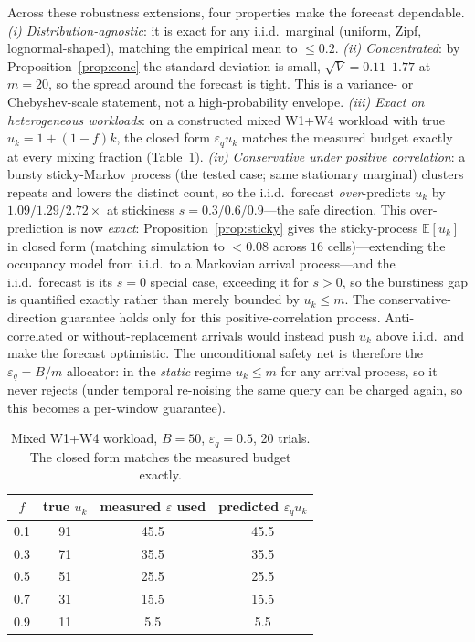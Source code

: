 \documentclass[sigconf,nonacm]{acmart}
\newcommand{\eps}{\varepsilon}
\newcommand{\E}{\mathbb{E}}
\begin{document}
\noindent Across these robustness extensions, four properties make the forecast dependable. \emph{(i) Distribution-agnostic}: it is exact for any i.i.d.\ marginal (uniform, Zipf, lognormal-shaped), matching the empirical mean to $\le0.2$. \emph{(ii) Concentrated}: by Proposition~\ref{prop:conc} the standard deviation is small, $\sqrt V{=}0.11$--$1.77$ at $m{=}20$, so the spread around the forecast is tight. This is a variance- or Chebyshev-scale statement, not a high-probability envelope. \emph{(iii) Exact on heterogeneous workloads}: on a constructed mixed W1+W4 workload with true $u_k=1+(1-f)k$, the closed form $\eps_q u_k$ matches the measured budget exactly at every mixing fraction (Table~\ref{tab:mixed}). \emph{(iv) Conservative under \emph{positive} correlation}: a bursty sticky-Markov process (the tested case; same stationary marginal) clusters repeats and lowers the distinct count, so the i.i.d.\ forecast \emph{over}-predicts $u_k$ by $1.09$/$1.29$/$2.72\times$ at stickiness $s{=}0.3$/$0.6$/$0.9$---the safe direction. This over-prediction is now \emph{exact}: Proposition~\ref{prop:sticky} gives the sticky-process $\E[u_k]$ in closed form (matching simulation to $<0.08$ across $16$ cells)---extending the occupancy model from i.i.d.\ to a Markovian arrival process---and the i.i.d.\ forecast is its $s{=}0$ special case, exceeding it for $s{>}0$, so the burstiness gap is quantified exactly rather than merely bounded by $u_k\le m$. The conservative-direction guarantee holds only for this positive-correlation process. Anti-correlated or without-replacement arrivals would instead push $u_k$ above i.i.d.\ and make the forecast optimistic. The unconditional safety net is therefore the $\eps_q{=}B/m$ allocator: in the \emph{static} regime $u_k\le m$ for any arrival process, so it never rejects (under temporal re-noising the same query can be charged again, so this becomes a per-window guarantee).

\begin{table}[h]
\caption{Mixed W1+W4 workload, $B{=}50$, $\eps_q{=}0.5$, 20 trials. The closed form matches the measured budget exactly.}
\label{tab:mixed}
\centering\small
\begin{tabular}{c|c|cc}
\toprule
$f$ & true $u_k$ & measured $\eps$ used & predicted $\eps_q u_k$ \\
\midrule
0.1 & 91 & 45.5 & 45.5 \\
0.3 & 71 & 35.5 & 35.5 \\
0.5 & 51 & 25.5 & 25.5 \\
0.7 & 31 & 15.5 & 15.5 \\
0.9 & 11 & 5.5 & 5.5 \\
\bottomrule
\end{tabular}
\end{table}
\end{document}
